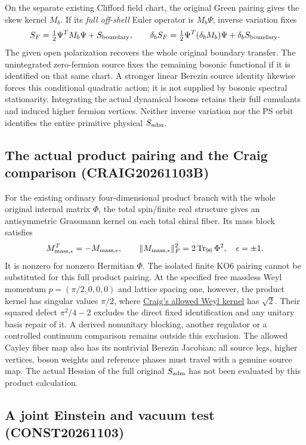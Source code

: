 On the separate existing Clifford field chart, the original Green
pairing gives the skew kernel $M_b$. If its \emph{full off-shell}
Euler operator is $M_b\Psi$, inverse variation fixes
\[
 S_F=\tfrac12\Psi^T M_b\Psi+S_{\rm boundary},\qquad
 \delta_b S_F=\tfrac12\Psi^T(\delta_bM_b)\Psi
                         +\delta_b S_{\rm boundary}.
\]
The given open polarization recovers the whole original boundary
transfer. The unintegrated zero-fermion source fixes the remaining
bosonic functional if it is identified on that same chart. A stronger
linear Berezin source identity likewise forces this conditional
quadratic action; it is not supplied by bosonic spectral stationarity.
Integrating the actual dynamical bosons retains their full cumulants
and induced higher fermion vertices. Neither inverse variation nor the
PS orbit identifies the entire primitive physical $S_{\rm adm}$.

\subsection*{The actual product pairing and the Craig comparison
(CRAIG20261103B)}

For the existing ordinary four-dimensional product branch with the
whole original internal matrix $\Phi$, the total spin/finite real
structure gives an antisymmetric Grassmann kernel on each total
chiral fiber. Its mass block satisfies
\[
 M_{{\rm mass},\epsilon}^{T}=-M_{{\rm mass},\epsilon},\qquad
 \|M_{{\rm mass},\epsilon}\|_F^2
       =2\operatorname{Tr}_{96}\Phi^2,\quad \epsilon=\pm1.
\]
It is nonzero for nonzero Hermitian $\Phi$. The isolated finite KO6
pairing cannot be substituted for this full product pairing. At the
specified free massless Weyl momentum $p=(\pi/2,0,0,0)$ and lattice
spacing one, however, the product kernel has singular values $\pi/2$,
where \href{https://arxiv.org/html/2610.09093v1}{Craig's allowed Weyl kernel}
has $\sqrt2$. Their squared defect
$\pi^2/4-2$ excludes the direct fixed identification and any unitary
basis repair of it. A derived nonunitary blocking, another regulator
or a controlled continuum comparison remains outside this exclusion.
The allowed Cayley fiber map also has its nontrivial Berezin Jacobian;
all source legs, higher vertices, boson weights and reference phases
must travel with a genuine source map. The actual Hessian of the full
original $S_{\rm adm}$ has not been evaluated by this product calculation.

\subsection*{A joint Einstein and vacuum test (CONST20261103)}

